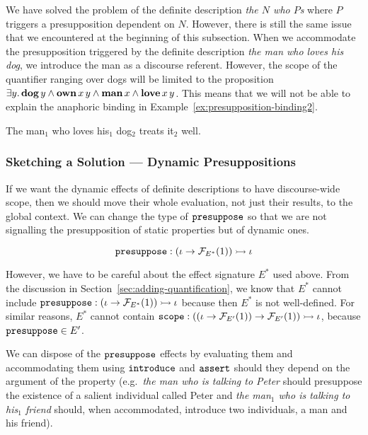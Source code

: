We have solved the problem of the definite description \emph{the $N$ who
  $P$s} where $P$ triggers a presupposition dependent on $N$. However,
there is still the same issue that we encountered at the beginning of this
subsection. When we accommodate the presupposition triggered by the
definite description \emph{the man who loves his dog}, we introduce the man
as a discourse referent. However, the scope of the quantifier ranging over
dogs will be limited to the proposition
$\exists y.\, \textbf{dog}\,y \land \textbf{own}\,x\,y \land
\textbf{man}\,x \land \textbf{love}\,x\,y$. This means that we will
not be able to explain the anaphoric binding in
Example~\ref{ex:presupposition-binding2}.

\begin{exe}
  \ex The man$_1$ who loves his$_1$ dog$_2$ treats it$_2$ well. \label{ex:presupposition-binding2}
\end{exe}


\subsubsection{Sketching a Solution --- Dynamic Presuppositions}

If we want the dynamic effects of definite descriptions to have
discourse-wide scope, then we should move their whole evaluation, not just
their results, to the global context. We can change the type of
$\mathtt{presuppose}$ so that we are not signalling the presupposition of
static properties but of dynamic ones.

$$
\mathtt{presuppose} : (\iota \to \mathcal{F}_{E^*}(1)) \rightarrowtail \iota
$$

However, we have to be careful about the effect signature $E^*$ used
above. From the discussion in Section~\ref{sec:adding-quantification}, we
know that $E^*$ cannot include
$\mathtt{presuppose} : (\iota \to \mathcal{F}_{E^*}(1)) \rightarrowtail \iota$ because then $E^*$
is not well-defined. For similar reasons, $E^*$ cannot contain
$\mathtt{scope} : ((\iota \to \mathcal{F}_{E'}(1)) \to \mathcal{F}_{E'}(1)) \rightarrowtail \iota$,
because $\mathtt{presuppose} \in E'$.

We can dispose of the $\mathtt{presuppose}$ effects by evaluating them and
accommodating them using $\mathtt{introduce}$ and $\mathtt{assert}$ should they
depend on the argument of the property (e.g.\ \emph{the man who is talking
  to Peter} should presuppose the existence of a salient individual called
Peter and \emph{the man$_1$ who is talking to his$_1$ friend} should, when
accommodated, introduce two individuals, a man and his friend).

